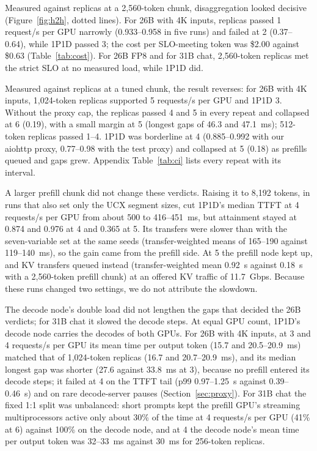 \documentclass[11pt]{article}
\begin{document}
Measured against replicas at a 2,560-token chunk, disaggregation looked decisive (Figure~\ref{fig:h2h}, dotted lines). For 26B with 4K inputs, replicas passed 1 request/s per GPU narrowly (0.933--0.958 in five runs) and failed at 2 (0.37--0.64), while 1P1D passed 3; the cost per SLO-meeting token was \$2.00 against \$0.63 (Table~\ref{tab:cost}). For 26B FP8 and for 31B chat, 2,560-token replicas met the strict SLO at no measured load, while 1P1D did.

Measured against replicas at a tuned chunk, the result reverses: for 26B with 4K inputs, 1,024-token replicas supported 5 requests/s per GPU and 1P1D 3. Without the proxy cap, the replicas passed 4 and 5 in every repeat and collapsed at 6 (0.19), with a small margin at 5 (longest gaps of 46.3 and 47.1~ms); 512-token replicas passed 1--4. 1P1D was borderline at 4 (0.885--0.992 with our aiohttp proxy, 0.77--0.98 with the test proxy) and collapsed at 5 (0.18) as prefills queued and gaps grew. Appendix Table~\ref{tab:ci} lists every repeat with its interval.

A larger prefill chunk did not change these verdicts. Raising it to 8,192 tokens, in runs that also set only the UCX segment sizes, cut 1P1D's median TTFT at 4 requests/s per GPU from about 500 to 416--451~ms, but attainment stayed at 0.874 and 0.976 at 4 and 0.365 at 5. Its transfers were slower than with the seven-variable set at the same seeds (transfer-weighted means of 165--190 against 119--140~ms), so the gain came from the prefill side. At 5 the prefill node kept up, and KV transfers queued instead (transfer-weighted mean 0.92~s against 0.18~s with a 2,560-token prefill chunk) at an offered KV traffic of 11.7~Gbps. Because these runs changed two settings, we do not attribute the slowdown.

The decode node's double load did not lengthen the gaps that decided the 26B verdicts; for 31B chat it slowed the decode steps. At equal GPU count, 1P1D's decode node carries the decodes of both GPUs. For 26B with 4K inputs, at 3 and 4 requests/s per GPU its mean time per output token (15.7 and 20.5--20.9~ms) matched that of 1,024-token replicas (16.7 and 20.7--20.9~ms), and its median longest gap was shorter (27.6 against 33.8~ms at 3), because no prefill entered its decode steps; it failed at 4 on the TTFT tail (p99 0.97--1.25~s against 0.39--0.46~s) and on rare decode-server pauses (Section~\ref{sec:proxy}). For 31B chat the fixed 1:1 split was unbalanced: short prompts kept the prefill GPU's streaming multiprocessors active only about 30\% of the time at 4 requests/s per GPU (41\% at 6) against 100\% on the decode node, and at 4 the decode node's mean time per output token was 32--33~ms against 30~ms for 256-token replicas.
\end{document}
